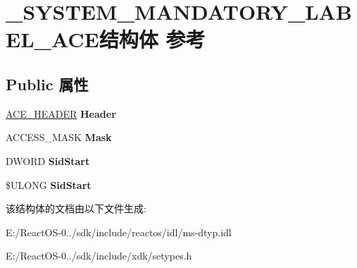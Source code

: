 \hypertarget{struct___s_y_s_t_e_m___m_a_n_d_a_t_o_r_y___l_a_b_e_l___a_c_e}{}\section{\+\_\+\+S\+Y\+S\+T\+E\+M\+\_\+\+M\+A\+N\+D\+A\+T\+O\+R\+Y\+\_\+\+L\+A\+B\+E\+L\+\_\+\+A\+C\+E结构体 参考}
\label{struct___s_y_s_t_e_m___m_a_n_d_a_t_o_r_y___l_a_b_e_l___a_c_e}
\subsection*{Public 属性}
\begin{DoxyCompactItemize}
\item 
\mbox{\label{struct___s_y_s_t_e_m___m_a_n_d_a_t_o_r_y___l_a_b_e_l___a_c_e_ae20ff0afebb7d666718d5078e3a63562}} 
\hyperlink{struct___a_c_e___h_e_a_d_e_r}{A\+C\+E\+\_\+\+H\+E\+A\+D\+ER} {\bfseries Header}
\item 
\mbox{\label{struct___s_y_s_t_e_m___m_a_n_d_a_t_o_r_y___l_a_b_e_l___a_c_e_a5dfafba1dfe328106bd2829e556331a0}} 
A\+C\+C\+E\+S\+S\+\_\+\+M\+A\+SK {\bfseries Mask}
\item 
\mbox{\label{struct___s_y_s_t_e_m___m_a_n_d_a_t_o_r_y___l_a_b_e_l___a_c_e_a81796f746ee4331f54f9cc73bed9efc0}} 
D\+W\+O\+RD {\bfseries Sid\+Start}
\item 
\mbox{\label{struct___s_y_s_t_e_m___m_a_n_d_a_t_o_r_y___l_a_b_e_l___a_c_e_a4a0fbb498adfdad18da4101e5958b37e}} 
\$U\+L\+O\+NG {\bfseries Sid\+Start}
\end{DoxyCompactItemize}


该结构体的文档由以下文件生成\+:\begin{DoxyCompactItemize}
\item 
E\+:/\+React\+O\+S-\/0../sdk/include/reactos/idl/ms-\/dtyp.\+idl\item 
E\+:/\+React\+O\+S-\/0../sdk/include/xdk/setypes.\+h\end{DoxyCompactItemize}
